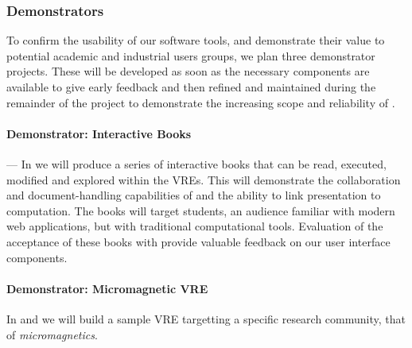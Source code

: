 \subsubsection{Demonstrators}


To confirm the usability of our software tools, and demonstrate their
value to potential academic and industrial users groups, we plan three
demonstrator projects. These will be developed as soon as the
necessary components are available to give early feedback and then
refined and maintained during the remainder of the project to
demonstrate the increasing scope and reliability of \TheProject.


\paragraph{Demonstrator: Interactive Books} ---
In   we will produce a series of interactive books
that can be read, executed, modified and explored within the
\TheProject VREs. This will demonstrate the collaboration and
document-handling capabilities of \TheProject and the ability to link
presentation to computation. The books will target students, an
audience familiar with modern web applications, but with traditional
computational tools. Evaluation of the acceptance of these books with
provide valuable feedback on our user interface components.


\paragraph{Demonstrator: Micromagnetic VRE}
\label{sec:introduction-micromagnetic-vre-demonstrator}In 
and  we will build
a sample VRE targetting a specific research community, that of \textit{micromagnetics}.

